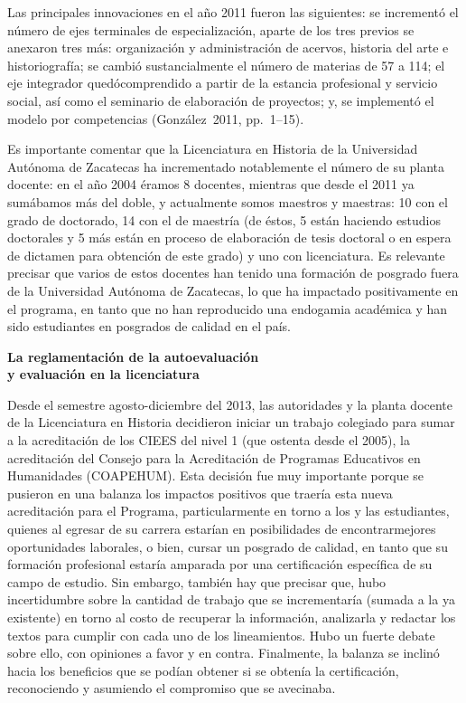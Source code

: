 {\medskip
Las principales innovaciones en el año 2011 fueron las siguientes: se incrementó
el número de ejes terminales de especialización, aparte de los tres previos
se anexaron tres más: organización y administración de acervos, historia
del arte e historiografía; se cambió sustancialmente el número de materias
de 57 a 114; el eje integrador quedó\linebreak comprendido a partir de la estancia
profesional y servicio social, así como el seminario de elaboración de
proyectos; y, se implementó el modelo por competencias (González~2011,
pp.~1--15).

Es importante comentar que la Licenciatura en Historia de la Universidad
Autónoma de Zacatecas ha incrementado notablemente el número de su planta
docente: en el año 2004 éramos 8 docentes, mientras que desde el 2011 ya
sumábamos más del doble, y actualmente somos maestros y maestras: 10 con
el grado de doctorado, 14 con el de maestría (de éstos, 5 están haciendo
estudios doctorales y 5 más están en proceso de elaboración de tesis
doctoral o en espera de dictamen para obtención de este grado) y uno con
licenciatura. Es relevante precisar que varios de estos docentes han tenido
una formación de posgrado fuera de la Universidad Autónoma de Zacatecas, lo
que ha impactado positivamente en el programa, en tanto que no han
reproducido una endogamia académica y han sido estudiantes en posgrados de
calidad en el país.


\bigskip 
\textbf{La reglamentación de la autoevaluación\\ y evaluación en la
licenciatura}

Desde el semestre agosto-diciembre del 2013, las autoridades y la planta
docente de la Licenciatura en Historia decidieron iniciar un trabajo
colegiado para sumar a la acreditación de los CIEES del nivel 1 (que
ostenta desde el 2005),  la acreditación del Consejo para la Acreditación
de Programas Educativos en Humanidades (COAPEHUM). Esta decisión fue muy
importante porque se pusieron en una balanza los impactos positivos que
traería esta nueva acreditación para el Programa, particularmente en torno
a los y las estudiantes, quienes al egresar de su carrera estarían en
posibilidades de encontrar\linebreak mejores oportunidades laborales, o bien, cursar
un posgrado de calidad, en tanto que su formación profesional estaría
amparada por una certificación específica de su campo de estudio. Sin
embargo, también hay que precisar que, hubo incertidumbre sobre la cantidad
de trabajo que se incrementaría (sumada a la ya existente) en torno al
costo de recuperar la información, analizarla y redactar los textos para
cumplir con cada uno de los lineamientos. Hubo un fuerte debate sobre ello,
con opiniones a favor y en contra. Finalmente, la balanza se inclinó hacia
los beneficios que se podían obtener si se obtenía la certificación,
reconociendo y asumiendo el compromiso que se avecinaba. 

}
